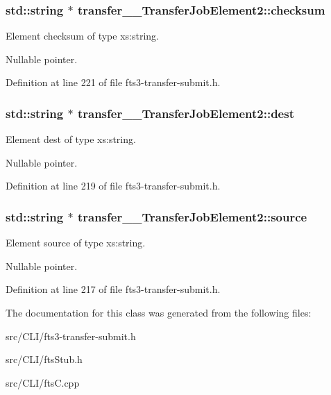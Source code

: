 \subsubsection[{checksum}]{\setlength{\rightskip}{0pt plus 5cm}std::string $\ast$ {\bf transfer\_\-\_\-TransferJobElement2::checksum}}\label{classtransfer____TransferJobElement2_a0a1f9ef5e139f3b425f50a37a1022118}


Element checksum of type xs:string. 

Nullable pointer. 

Definition at line 221 of file fts3-\/transfer-\/submit.h.

\subsubsection[{dest}]{\setlength{\rightskip}{0pt plus 5cm}std::string $\ast$ {\bf transfer\_\-\_\-TransferJobElement2::dest}}\label{classtransfer____TransferJobElement2_a6c50f9c4b0c2a6394c4004bb486355e5}


Element dest of type xs:string. 

Nullable pointer. 

Definition at line 219 of file fts3-\/transfer-\/submit.h.

\subsubsection[{source}]{\setlength{\rightskip}{0pt plus 5cm}std::string $\ast$ {\bf transfer\_\-\_\-TransferJobElement2::source}}\label{classtransfer____TransferJobElement2_aac5f816bc5bf77fe3e33348a4cfb16db}


Element source of type xs:string. 

Nullable pointer. 

Definition at line 217 of file fts3-\/transfer-\/submit.h.



The documentation for this class was generated from the following files:\begin{DoxyCompactItemize}
\item 
src/CLI/fts3-\/transfer-\/submit.h\item 
src/CLI/ftsStub.h\item 
src/CLI/ftsC.cpp\end{DoxyCompactItemize}
